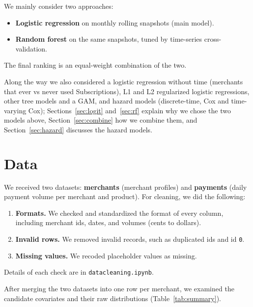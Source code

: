 \documentclass[11pt]{article}
\newcommand{\code}[1]{\begingroup\renewcommand{\_}{\textunderscore\allowbreak}\texttt{#1}\endgroup}  %
\begin{document}
We mainly consider two approaches:
\begin{itemize}
  \item \textbf{Logistic regression} on monthly rolling snapshots (main model).
  \item \textbf{Random forest} on the same snapshots, tuned by time-series cross-validation.
\end{itemize}
The final ranking is an equal-weight combination of the two.

Along the way we also considered a logistic regression without time (merchants that ever vs never used Subscriptions), L1 and L2 regularized logistic regressions, other tree models and a GAM, and hazard models (discrete-time, Cox and time-varying Cox); Sections~\ref{sec:logit} and~\ref{sec:rf} explain why we chose the two models above, Section~\ref{sec:combine} how we combine them, and Section~\ref{sec:hazard} discusses the hazard models.

\section{Data}\label{sec:data}

We received two datasets: \textbf{merchants} (merchant profiles) and \textbf{payments} (daily payment volume per merchant and product). For cleaning, we did the following:
\begin{enumerate}
  \item \textbf{Formats.} We checked and standardized the format of every column, including merchant ids, dates, and volumes (cents to dollars).
  \item \textbf{Invalid rows.} We removed invalid records, such as duplicated ids and id \code{0}.
  \item \textbf{Missing values.} We recoded placeholder values as missing.
\end{enumerate}
Details of each check are in \code{data\_cleaning.ipynb}.

After merging the two datasets into one row per merchant, we examined the candidate covariates and their raw distributions (Table~\ref{tab:summary}).
\end{document}
